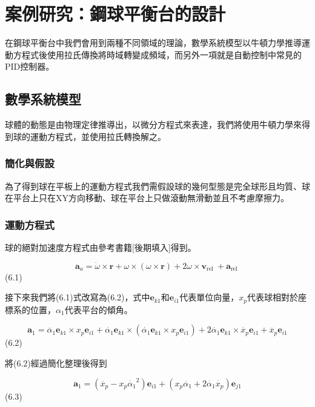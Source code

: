 \chapter{案例研究：鋼球平衡台的設計}
在鋼球平衡台中我們會用到兩種不同領域的理論，數學系統模型以牛頓力學推導運動方程式後使用拉氏傳換將時域轉變成頻域，而另外一項就是自動控制中常見的PID控制器。

\section{數學系統模型}
球體的動態是由物理定律推導出，以微分方程式來表達，我們將使用牛頓力學來得到球的運動方程式，並使用拉氏轉換解之。

\subsection{簡化與假設}
為了得到球在平板上的運動方程式我們需假設球的幾何型態是完全球形且均質、球在平台上只在XY方向移動、球在平台上只做滾動無滑動並且不考慮摩擦力。

\subsection{運動方程式}
球的絕對加速度方程式由參考書籍[後期填入]得到。

\begin{equation}
\mathbf{a}_a=\dot{\omega} \times \mathbf{r}+\omega \times(\omega \times \mathbf{r})+2 \omega \times \mathbf{v}_{\text {rel }}+\mathbf{a}_{\text {rel }}
\end{equation} 
(6.1)

接下來我們將(6.1)式改寫為(6.2)，式中\(\mathbf{e}_{k 1}\)和\(\mathbf{e}_{i 1}\)代表單位向量，\(x_p\)代表球相對於座標系的位置，\({\alpha_1}\)代表平台的傾角。

\begin{equation}
\mathbf{a}_1=\ddot{\alpha_1} \mathbf{e}_{k 1} \times x_p \mathbf{e}_{i 1}+\dot{\alpha_1} \mathbf{e}_{k 1} \times\left(\dot{\alpha_1} \mathbf{e}_{k 1} \times x_p \mathbf{e}_{i 1}\right)+2 \dot{\alpha_1} \mathbf{e}_{k 1} \times \dot{x_p} \mathbf{e}_{i 1}+\ddot{x_p} \mathbf{e}_{i 1}
\end{equation} 
(6.2)

將(6.2)經過簡化整理後得到

\begin{equation}
\mathbf{a}_1= \left( \ddot{x_p} - x_p \dot{\alpha_1}^2 \right) \mathbf{e}_{i 1} + \left( x_p \ddot{\alpha_1} + 2 \dot{\alpha_1} \dot{x_p} \right) \mathbf{e}_{j 1}
\end{equation}
(6.3)

